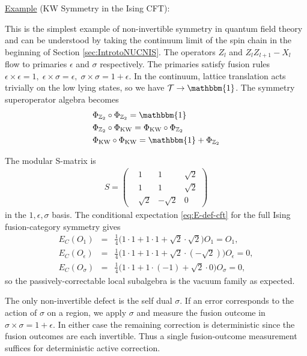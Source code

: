 \documentclass{article}
\theoremstyle{definition}
\begin{document}
  \underline{Example} (KW Symmetry in the Ising CFT):

  This is the simplest example of non-invertible symmetry in quantum field
  theory and can be understood by taking the continuum limit of the spin chain
  in the beginning of Section \ref{sec:IntrotoNUCNIS}. The operators $Z_{l}$ and
  $Z_{l}Z_{l+1}- X_{l}$ flow to primaries $\epsilon$ and $\sigma$ respectively.
  The primaries satisfy fusion rules
  $\epsilon \times \epsilon = 1,\;\epsilon \times \sigma = \epsilon,\;\sigma \times
  \sigma = 1 + \epsilon$. In the continuum, lattice translation acts trivially
  on the low lying states, so we have $\mathcal{T}\rightarrow \mathbbm{1}$. The
  symmetry superoperator algebra becomes
  \begin{eqnarray}
    &\Phi_{\mathbb{Z}_2} \circ \Phi_{\mathbb{Z}_2} = \mathbbm{1}\\
    &\Phi_{\mathbb{Z}_2} \circ \Phi_{\text{KW}} = \Phi_{\text{KW}} \circ \Phi_{\mathbb{Z}_2}\\
    &\Phi_{\text{KW}} \circ \Phi_{\text{KW}} = \mathbbm{1} + \Phi_{\mathbb{Z}_2}
  \end{eqnarray}

  The modular S-matrix is
  \begin{eqnarray}
    S =
    \begin{pmatrix}
       & 1        & 1         & \sqrt{2} \\
       & 1        & 1         & \sqrt{2} \\
       & \sqrt{2} & -\sqrt{2} & 0
    \end{pmatrix}
  \end{eqnarray}
  in the $1, \epsilon, \sigma$ basis. The conditional expectation \eqref{eq:E-def-cft}
  for the full Ising fusion-category symmetry gives
  \begin{eqnarray}
    E_{C}(O_1) &=& \frac{1}{4}\Big(1\cdot 1 + 1\cdot 1 + \sqrt{2}\cdot \sqrt{2}\Big)O_1
    = O_1,\\
    E_{C}(O_\epsilon) &=& \frac{1}{4}\Big(1\cdot 1 + 1\cdot 1 + \sqrt{2}\cdot (-\sqrt{2})\Big)O_\epsilon
    = 0,\\
    E_{C}(O_\sigma) &=& \frac{1}{4}\Big(1\cdot 1 + 1\cdot (-1) + \sqrt{2}\cdot 0\Big)O_\sigma
    = 0,
  \end{eqnarray}
  so the passively-correctable local subalgebra is the vacuum family as expected.

  The only non-invertible defect is the self dual $\sigma$. If an error
  corresponds to the action of $\sigma$ on a region, we apply $\sigma$ and measure
  the fusion outcome in $\sigma\times\sigma=1+\epsilon$. In either case the
  remaining correction is deterministic since the fusion outcomes are each
  invertible. Thus a single fusion-outcome measurement suffices for deterministic
  active correction.
\end{document}
